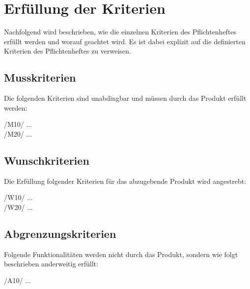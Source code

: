 \chapter{Erf\"ullung der Kriterien}

Nachfolgend wird beschrieben, wie die einzelnen Kriterien des Pflichtenheftes
erf\"ullt werden und worauf geachtet wird.  Es ist dabei explizit auf die
definierten Kriterien des Pflichtenheftes zu verweisen.
\section{Musskriterien}

Die folgenden Kriterien sind unabdingbar und m\"ussen durch das Produkt erf\"ullt
werden:

/M10/ ... \\
/M20/ ... \\

\section{Wunschkriterien}
Die Erf\"ullung folgender Kriterien f\"ur das abzugebende Produkt wird angestrebt:

/W10/ ... \\
/W20/ ... \\


\section{Abgrenzungskriterien}
Folgende Funktionalit\"aten werden nicht durch das Produkt, sondern wie folgt
beschrieben anderweitig erf\"ullt:

/A10/ ... \\
